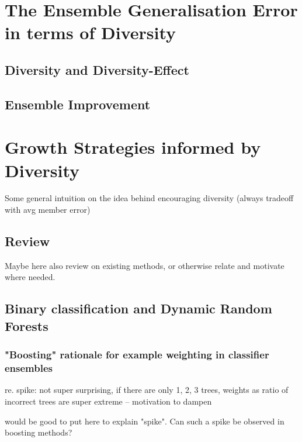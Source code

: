 \documentclass[
    a4paper, %
	fontsize=10pt, %
	twoside=false, %
]{kaobook}
\begin{document}
\chapter{The Ensemble Generalisation Error in terms of Diversity}



\section{Diversity and Diversity-Effect}




\section{Ensemble Improvement}


\chapter{Growth Strategies informed by Diversity}

Some general intuition on the idea behind encouraging diversity (always tradeoff with avg member error)

\section{Review} 
Maybe here also review on existing methods, or otherwise relate and motivate where needed.


\section{Binary classification and Dynamic Random Forests}


\subsection{"Boosting" rationale for example weighting in classifier ensembles}

re. spike: not super surprising, if there are only 1, 2, 3 trees, weights as ratio of incorrect trees are super extreme -- motivation to dampen

would be good to put here to explain "spike". Can such a spike be observed in boosting methods?
\end{document}
